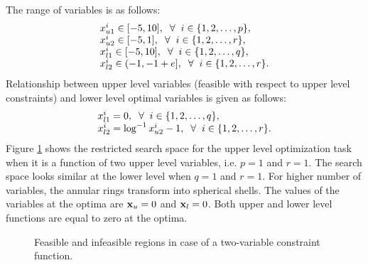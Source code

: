 \documentclass[twoside]{article}
\begin{document}
The range of variables is as follows:
\begin{equation}
\begin{array}{l}
x_{u1}^{i} \in [-5,10], \hspace{2mm} \forall \hspace{2mm} i \in \{1,2,\ldots,p\},\\
x_{u2}^{i} \in [-5,1], \hspace{2mm} \forall \hspace{2mm} i \in \{1,2,\ldots,r\},\\
x_{l1}^{i} \in [-5,10], \hspace{2mm} \forall \hspace{2mm} i \in \{1,2,\ldots,q\},\\
x_{l2}^{i} \in (-1,-1+e], \hspace{2mm} \forall \hspace{2mm} i \in \{1,2,\ldots,r\}.
\end{array}
\end{equation}
Relationship between upper level variables (feasible with respect to upper level constraints) and lower level optimal variables is given as follows:
\begin{equation}
\begin{array}{l}
x_{l1}^{i} = 0, \hspace{2mm} \forall \hspace{2mm} i \in \{1,2,\ldots,q\},\\
x_{l2}^{i} = \log^{-1} x_{u2}^{i} - 1, \hspace{2mm} \forall \hspace{2mm} i \in \{1,2,\ldots,r\}.
\end{array}
\end{equation}
Figure \ref{fig:annular} shows the restricted search space for the upper level optimization task when it is a function of two upper level variables, i.e. $p=1$ and $r=1$. The search space looks similar at the lower level when $q=1$ and $r=1$. For higher number of variables, the annular rings transform into spherical shells. The values of the variables at the optima are $\mbox{$\mathbf{x}$}_u=0$ and $\mbox{$\mathbf{x}$}_l=0$. Both upper and
lower level functions are equal to zero at the optima.

\begin{figure}
\begin{center}
\caption{Feasible and infeasible regions in case of a two-variable constraint function.}
\label{fig:annular}
\end{center}
\end{figure}
\end{document}
